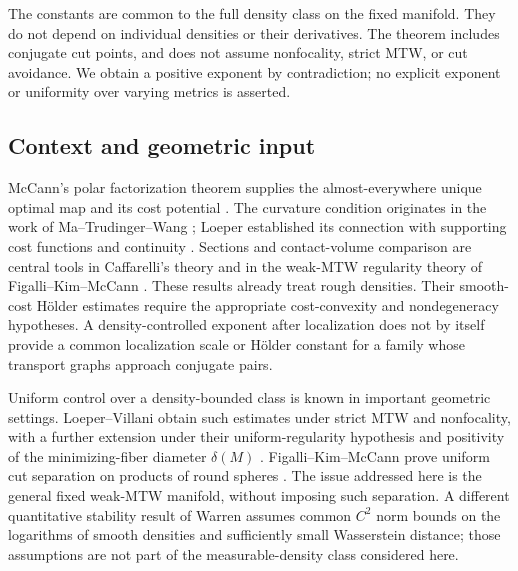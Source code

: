 The constants are common to the full density class on the fixed
manifold. They do not depend on individual densities or their
derivatives. The theorem includes conjugate cut points, and does not
assume nonfocality, strict MTW, or cut avoidance. We obtain a positive
exponent by contradiction; no explicit exponent or uniformity over
varying metrics is asserted.

\subsection{Context and geometric input}

McCann's polar factorization theorem supplies the almost-everywhere
unique optimal map and its cost potential \cite{McCann2001}.
The curvature condition originates in the work of
Ma--Trudinger--Wang \cite{MTW2005}; Loeper established its connection
with supporting cost functions and continuity \cite{Loeper2009}.
Sections and contact-volume comparison are central tools in
Caffarelli's theory \cite{Caffarelli1992} and in the weak-MTW
regularity theory of Figalli--Kim--McCann
\cite[Theorem~2.1 and Corollary~9.6]{FKM2013Holder}. These results already treat rough densities.
Their smooth-cost H\"older estimates require the appropriate
cost-convexity and nondegeneracy hypotheses. A density-controlled
exponent after localization does not by itself provide a common
localization scale or H\"older constant for a family whose transport
graphs approach conjugate pairs.

Uniform control over a density-bounded class is known in important
geometric settings. Loeper--Villani obtain such estimates under
strict MTW and nonfocality, with a further extension under their
uniform-regularity hypothesis and positivity of the minimizing-fiber
diameter $\delta(M)$
\cite[Corollaries~8.3--8.4]{LoeperVillani2010}.
Figalli--Kim--McCann prove uniform cut separation on products of
round spheres \cite[Theorem~5.1 and Corollary~5.2]{FKM2013Spheres}.
The issue addressed here is the general fixed weak-MTW manifold,
without imposing such separation. A different quantitative stability
result of Warren \cite[Theorem~1]{Warren2026} assumes common
$C^2$ norm bounds on the logarithms of smooth densities and sufficiently small
Wasserstein distance; those assumptions are not part of the
measurable-density class considered here.


